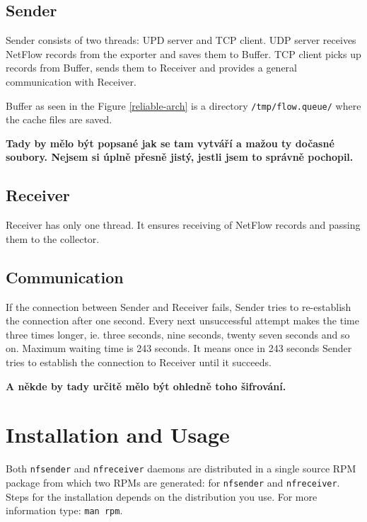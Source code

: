 \documentclass[11pt,a4paper]{article}
\begin{document}
\subsection{Sender}

Sender consists of two threads: UPD server and TCP client. UDP server receives NetFlow records from the exporter and saves them to Buffer. TCP client picks up records from Buffer, sends them to Receiver and provides a general communication with Receiver.

Buffer as seen in the Figure \ref{reliable-arch} is a directory \texttt{/tmp/flow.queue/} where the cache files are saved.

\textbf{Tady by mělo být popsané jak se tam vytváří a mažou ty dočasné soubory. Nejsem si úplně přesně jistý, jestli jsem to správně pochopil.}

\subsection{Receiver}

Receiver has only one thread. It ensures receiving of NetFlow records and passing them to the collector.

\subsection{Communication}

If the connection between Sender and Receiver fails, Sender tries to re-establish the connection after one second. Every next unsuccessful attempt makes the time three times longer, ie. three seconds, nine seconds, twenty seven seconds and so on. Maximum waiting time is 243 seconds. It means once in 243 seconds Sender tries to establish the connection to Receiver until it succeeds.

\textbf{A někde by tady určitě mělo být ohledně toho šifrování.}

\section{Installation and Usage}

Both \texttt{nf\textunderscore sender} and \texttt{nf\textunderscore receiver} daemons are distributed in a single source RPM package from which two RPMs are generated: for \texttt{nf\textunderscore sender} and \texttt{nf\textunderscore receiver}. Steps for the installation depends on the distribution you use. For more information type: \texttt{man rpm}.
\end{document}
